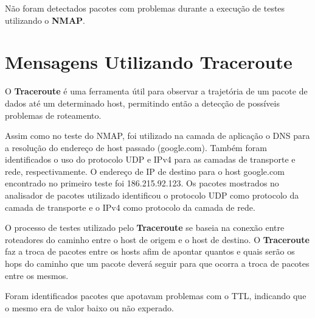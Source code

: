   Não foram detectados pacotes com problemas durante a execução de testes utilizando o \textbf{NMAP}.


\section{Mensagens Utilizando Traceroute}

O \textbf{Traceroute} é uma ferramenta útil para observar a trajetória de um pacote de dados até um determinado host, permitindo então a detecção de possíveis problemas de roteamento.

Assim como no teste do NMAP, foi utilizado na camada de aplicação o DNS para a resolução do endereço de host passado (google.com). Também foram identificados o uso do protocolo UDP e IPv4 para as camadas de transporte e rede, respectivamente.
O endereço de IP de destino para o host google.com encontrado no primeiro teste foi 186.215.92.123. Os pacotes mostrados no analisador de pacotes utilizado identificou o protocolo UDP como protocolo da camada de transporte e o IPv4 como protocolo da camada de rede.

O processo de testes utilizado pelo \textbf{Traceroute} se baseia na conexão entre roteadores do caminho entre o host de origem e o host de destino. O \textbf{Traceroute} faz a troca de pacotes entre os hosts afim de apontar quantos e quais serão os hops do caminho que um pacote deverá seguir para que ocorra a troca de pacotes entre os mesmos.

Foram identificados pacotes que apotavam problemas com o TTL, indicando que o mesmo era de valor baixo ou não experado.
